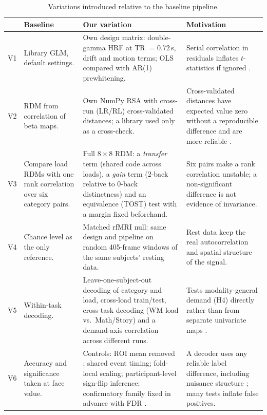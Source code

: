 \documentclass[conference]{IEEEtran}
\begin{document}
\begin{table}[t]
\caption{Variations introduced relative to the baseline pipeline.}
\label{tab:variations}
\centering\footnotesize
\renewcommand{\arraystretch}{1.15}
\begin{tabular}{@{}p{0.5cm}p{3.6cm}p{6.6cm}p{5.6cm}@{}}
\toprule
 & \textbf{Baseline} & \textbf{Our variation} & \textbf{Motivation}\\
\midrule
V1 & Library GLM, default settings. & Own design matrix: double-gamma HRF at TR $=0.72$\,s, drift and motion terms; OLS compared with AR(1) prewhitening. & Serial correlation in residuals inflates $t$-statistics if ignored \cite{woolrich2001}.\\
V2 & RDM from correlation of beta maps. & Own NumPy RSA with cross-run (LR/RL) cross-validated distances; a library used only as a cross-check. & Cross-validated distances have expected value zero without a reproducible difference and are more reliable \cite{walther2016,nili2014}.\\
V3 & Compare load RDMs with one rank correlation over six category pairs. & Full $8\times8$ RDM: a \emph{transfer} term (shared code across loads), a \emph{gain} term (2-back relative to 0-back distinctness) and an equivalence (TOST) test with a margin fixed beforehand. & Six pairs make a rank correlation unstable; a non-significant difference is not evidence of invariance.\\
V4 & Chance level as the only reference. & Matched rfMRI null: same design and pipeline on random 405-frame windows of the same subjects' resting data. & Rest data keep the real autocorrelation and spatial structure of the signal.\\
V5 & Within-task decoding. & Leave-one-subject-out decoding of category and load, cross-load train/test, cross-task decoding (WM load vs.\ Math/Story) and a demand-axis correlation across different runs. & Tests modality-general demand (H4) directly rather than from separate univariate maps \cite{duncan2010}.\\
V6 & Accuracy and significance taken at face value. & Controls: ROI mean removed \cite{coutanche2013}; shared event timing; fold-local scaling; participant-level sign-flip inference; confirmatory family fixed in advance with FDR \cite{stelzer2013,nichols2002}. & A decoder uses any reliable label difference, including nuisance structure \cite{haynes2006}; many tests inflate false positives.\\
\bottomrule
\end{tabular}
\end{table}
\end{document}
